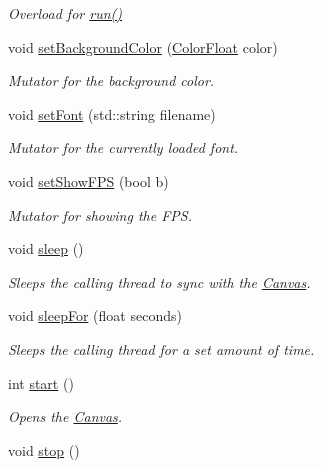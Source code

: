 \begin{DoxyCompactItemize}
\begin{DoxyCompactList}\small\item\em Overload for \hyperlink{classtsgl_1_1_canvas_a5f3f00d6c380a662a239077456045502}{run()} \end{DoxyCompactList}\item 
void \hyperlink{classtsgl_1_1_canvas_abb668fe42e2fe7f269b255152df959d8}{set\+Background\+Color} (\hyperlink{structtsgl_1_1_color_float}{Color\+Float} color)
\begin{DoxyCompactList}\small\item\em Mutator for the background color. \end{DoxyCompactList}\item 
void \hyperlink{classtsgl_1_1_canvas_a692edf8e37c7714cdf2a58ea530c63e9}{set\+Font} (std\+::string filename)
\begin{DoxyCompactList}\small\item\em Mutator for the currently loaded font. \end{DoxyCompactList}\item 
void \hyperlink{classtsgl_1_1_canvas_a8722c579dfa55a45e139bfeb269d73ff}{set\+Show\+F\+P\+S} (bool b)
\begin{DoxyCompactList}\small\item\em Mutator for showing the F\+P\+S. \end{DoxyCompactList}\item 
void \hyperlink{classtsgl_1_1_canvas_a2604fa056d4541f918ccf447eda1f3cf}{sleep} ()
\begin{DoxyCompactList}\small\item\em Sleeps the calling thread to sync with the \hyperlink{classtsgl_1_1_canvas}{Canvas}. \end{DoxyCompactList}\item 
void \hyperlink{classtsgl_1_1_canvas_a6674cc86b9a54b6a564021fddce47e36}{sleep\+For} (float seconds)
\begin{DoxyCompactList}\small\item\em Sleeps the calling thread for a set amount of time. \end{DoxyCompactList}\item 
int \hyperlink{classtsgl_1_1_canvas_a654315f9b08a9b3b072eebf4b4d8ae89}{start} ()
\begin{DoxyCompactList}\small\item\em Opens the \hyperlink{classtsgl_1_1_canvas}{Canvas}. \end{DoxyCompactList}\item 
void \hyperlink{classtsgl_1_1_canvas_a46cd37a9f2a146e57b4e0273faf6485c}{stop} ()

\end{DoxyCompactItemize}
